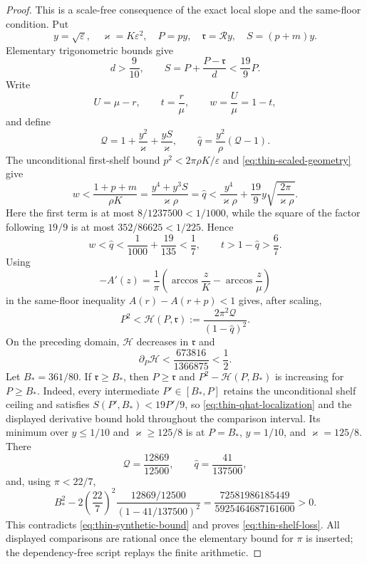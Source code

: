 \documentclass[11pt]{article}
\theoremstyle{remark}
\begin{document}
\begin{proof}
This is a scale-free consequence of the exact local slope and the
same-floor condition.  Put
\[
 y=\sqrt\varepsilon,
 \quad \varkappa=K\varepsilon^2,
 \quad P=py,
 \quad \mathfrak r=\mathcal R y,
 \quad S=(p+m)y.
\]
Elementary trigonometric bounds give
\begin{equation}
 d>\frac9{10},
 \qquad
 S=P+\frac{P-\mathfrak r}{d}<\frac{19}{9}P.
 \label{eq:thin-scaled-geometry}
\end{equation}
Write
\[
 U=\mu-r,\qquad t=\frac r\mu,\qquad
 w=\frac U\mu=1-t,
\]
and define
\[
 \mathcal Q=1+\frac{y^2}{\varkappa}
 +\frac{yS}{\varkappa},
 \qquad
 \widehat q=\frac{y^2}{\rho}(\mathcal Q-1).
\]
The unconditional first-shelf bound
$p^2<2\pi\rho K/\varepsilon$ and
\eqref{eq:thin-scaled-geometry} give
\[
 w<\frac{1+p+m}{\rho K}
 =\frac{y^4+y^3S}{\varkappa\rho}
 =\widehat q
 <\frac{y^4}{\varkappa\rho}
 +\frac{19}{9}y\sqrt{\frac{2\pi}{\varkappa\rho}}.
\]
Here the first term is at most $8/1237500<1/1000$, while the
square of the factor following $19/9$ is at most
$352/86625<1/225$.  Hence
\begin{equation}
 w<\widehat q<\frac1{1000}+\frac{19}{135}<\frac17,
 \qquad t>1-\widehat q>\frac67.
 \label{eq:thin-qhat-localization}
\end{equation}
Using
\[
 -A'(z)=\frac1\pi
 \left(\arccos\frac zK-\arccos\frac z\mu\right)
\]
in the same-floor inequality $A(r)-A(r+p)<1$ gives, after scaling,
\begin{equation}
 P^2<\mathcal H(P,\mathfrak r)
 :=\frac{2\pi^2\mathcal Q}{(1-\widehat q)^2}.
 \label{eq:thin-synthetic-bound}
\end{equation}
On the preceding domain, $\mathcal H$ decreases in $\mathfrak r$ and
\[
 \partial_P\mathcal H
 <\frac{673816}{1366875}<\frac12.
\]
Let $B_*=361/80$.  If $\mathfrak r\geq B_*$, then $P\geq\mathfrak r$
and $P^2-\mathcal H(P,B_*)$ is increasing for $P\geq B_*$.  Indeed,
every intermediate $P'\in[B_*,P]$ retains the unconditional shelf
ceiling and satisfies $S(P',B_*)<19P'/9$, so
\eqref{eq:thin-qhat-localization} and the displayed derivative bound hold
throughout the comparison interval.  Its minimum over $y\leq1/10$ and
$\varkappa\geq125/8$ is at
$P=B_*$, $y=1/10$, and $\varkappa=125/8$.  There
\[
 \mathcal Q=\frac{12869}{12500},
 \qquad
 \widehat q=\frac{41}{137500},
\]
and, using $\pi<22/7$,
\[
 B_*^2-2\left(\frac{22}{7}\right)^2
 \frac{12869/12500}{(1-41/137500)^2}
 =\frac{72581986185449}{5925464687161600}>0.
\]
This contradicts \eqref{eq:thin-synthetic-bound} and proves
\eqref{eq:thin-shelf-loss}.  All displayed comparisons are rational once
the elementary bound for $\pi$ is inserted; the dependency-free script
 replays the
finite arithmetic.
\end{proof}
\end{document}
